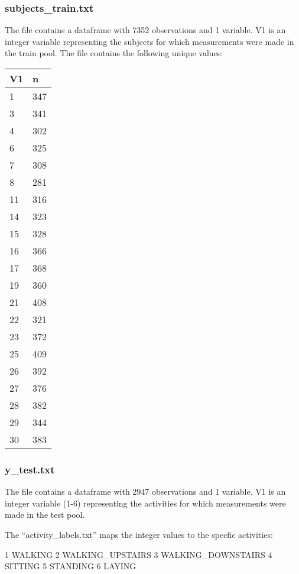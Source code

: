 \documentclass[
]{article}
\begin{document}
\hypertarget{subjects_train.txt}{%
\subsubsection{subjects\_train.txt}\label{subjects_train.txt}}

The file contains a dataframe with 7352 observations and 1 variable. V1
is an integer variable representing the subjects for which measurements
were made in the train pool. The file contains the following unique
values:

\begin{longtable}[]{@{}ll@{}}
\toprule()
V1 & n \\
\midrule()
\endhead
1 & 347 \\
3 & 341 \\
4 & 302 \\
6 & 325 \\
7 & 308 \\
8 & 281 \\
11 & 316 \\
14 & 323 \\
15 & 328 \\
16 & 366 \\
17 & 368 \\
19 & 360 \\
21 & 408 \\
22 & 321 \\
23 & 372 \\
25 & 409 \\
26 & 392 \\
27 & 376 \\
28 & 382 \\
29 & 344 \\
30 & 383 \\
\bottomrule()
\end{longtable}

\hypertarget{y_test.txt}{%
\subsubsection{y\_test.txt}\label{y_test.txt}}

The file contains a dataframe with 2947 observations and 1 variable. V1
is an integer variable (1-6) representing the activities for which
measurements were made in the test pool.

The ``activity\_labels.txt'' maps the integer values to the specfic
activities:

1 WALKING 2 WALKING\_UPSTAIRS 3 WALKING\_DOWNSTAIRS 4 SITTING 5 STANDING
6 LAYING
\end{document}
